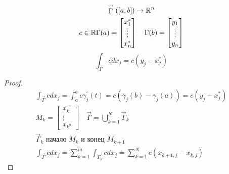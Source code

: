 \documentclass[main]{subfiles}
\begin{document}
\begin{theorem}
    \begin{gather*}
        \stackrel{\rightarrow}{\Gamma}([a,b]) \rightarrow {\vR^n} \\
        c \in \vR \Gamma(a) = \begin{bmatrix*}
            x_1^* \\
            \vdots \\
            x_n^*
        \end{bmatrix*} \quad \Gamma(b) = \begin{bmatrix}
            y_1 \\
            \vdots \\
            y_n
        \end{bmatrix} 
    \end{gather*}
    \[ \int_{\stackrel{\rightarrow}{\Gamma}}cdx_j = c(y_j - x_j^*) \]
\end{theorem}
\begin{proof}
    \begin{gather*}
        \int_{\stackrel{\rightarrow}{\Gamma}}cdx_j = \int^b_a c \gamma^\prime_j(t) = c(\gamma_j(b)-\gamma_j(a)) =
        c(y_j - x^*_j) \\
        M_k = \begin{bmatrix}
            x_{k^1} \\
            \vdots \\
            x_{k^n}
        \end{bmatrix} \quad \stackrel{\rightarrow}{\Gamma} = \bigcup^N_{k=1} \stackrel{\rightarrow}{\Gamma}_k \\
        \stackrel{\rightarrow}{\Gamma}_k \text{ начало } M_k \text{ и конец } M_{k+1} \\
        \int_{\stackrel{\rightarrow}{\Gamma}}cdx_j = \sum^m_{k=1} \int_{\stackrel{\rightarrow}{\Gamma_k}} cdx_j = \sum^N_{k=1}c(x_{k+1,j}-x_{k,j})
    \end{gather*}
\end{proof}
\end{document}
